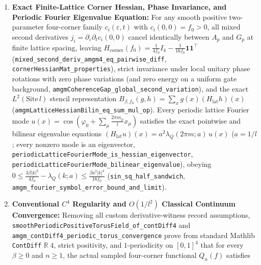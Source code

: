 \begin{enumerate}[leftmargin=2em]
  \item \textbf{Exact Finite-Lattice Corner Hessian, Phase Invariance, and Periodic Fourier Eigenvalue Equation:} For any smooth positive two-parameter four-corner family $c_i(\varepsilon, t)$ with $c_i(0,0) = f_0 > 0$, all mixed second derivatives $j_i = \partial_\varepsilon\partial_t c_i(0,0)$ cancel identically between $A_p$ and $G_p$ at finite lattice spacing, leaving $H_{\mathrm{corner}}(f_0) = \frac{1}{4f_0}I_4 - \frac{1}{16f_0}\mathbf{1}\mathbf{1}^\top$ (\texttt{mixed\_\allowbreak{}second\_\allowbreak{}deriv\_\allowbreak{}amgm4\_\allowbreak{}eq\_\allowbreak{}pairwise\_\allowbreak{}diff}, \texttt{cornerHessianMat\_\allowbreak{}properties}), strict invariance under local unitary phase rotations with zero phase variations (and zero energy on a uniform gate background, \texttt{amgmCoherenceGap\_\allowbreak{}global\_\allowbreak{}second\_\allowbreak{}variation}), and the exact $L^2(\mathrm{Site}\,l)$ stencil representation $B_{\beta,f_0}(g,h) = \sum_x g(x)(H_{\mathrm{lat}} h)(x)$ (\texttt{amgmLatticeHessianBilin\_\allowbreak{}eq\_\allowbreak{}sum\_\allowbreak{}mul\_\allowbreak{}op}). Every periodic lattice Fourier mode $u(x) = \cos(\varphi_0 + \sum_\mu \frac{2\pi m_\mu}{l} x_\mu)$ satisfies the exact pointwise and bilinear eigenvalue equations $(H_{\mathrm{lat}} u)(x) = a^2\lambda_Q(2\pi m; a)\,u(x)$ ($a = 1/l$; every nonzero mode is an eigenvector, \texttt{periodicLatticeFourierMode\_\allowbreak{}is\_\allowbreak{}hessian\_\allowbreak{}eigenvector}, \texttt{periodicLatticeFourierMode\_\allowbreak{}bilinear\_\allowbreak{}eigenvalue}), obeying $0 \le \frac{3\beta|k|^2}{4f_0} - \lambda_Q(k;a) \le \frac{\beta a^2|k|^4}{16f_0}$ (\texttt{sin\_\allowbreak{}sq\_\allowbreak{}half\_\allowbreak{}sandwich}, \texttt{amgm\_\allowbreak{}fourier\_\allowbreak{}symbol\_\allowbreak{}error\_\allowbreak{}bound\_\allowbreak{}and\_\allowbreak{}limit}).
  \item \textbf{Conventional $C^4$ Regularity and $O(1/l^2)$ Classical Continuum Convergence:} Removing all custom derivative-witness record assumptions, \texttt{smoothPeriodicPositiveTorusField\_\allowbreak{}of\_\allowbreak{}contDiff4} and \texttt{amgm\_\allowbreak{}contDiff4\_\allowbreak{}periodic\_\allowbreak{}torus\_\allowbreak{}convergence} prove from standard Mathlib \texttt{ContDiff} $\mathbb{R}\;4$, strict positivity, and $1$-periodicity on $[0,1]^4$ that for every $\beta \ge 0$ and $n \ge 1$, the actual sampled four-corner functional $Q_n(f)$ satisfies
  \begin{equation}

\end{equation}
\end{enumerate}
